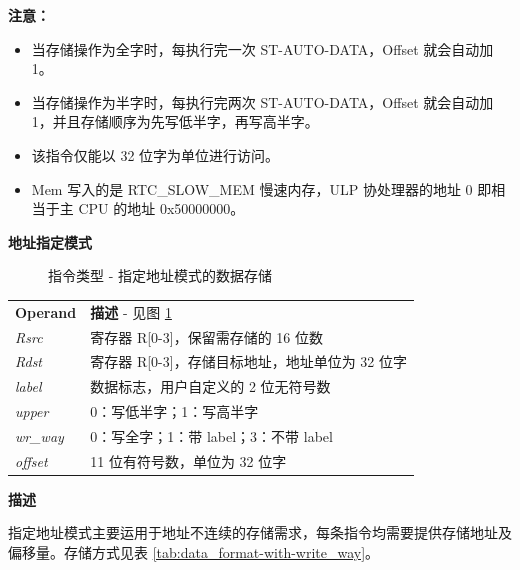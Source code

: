 \documentclass[main\_\_CN.tex]{subfiles}
\begin{document}
\textbf{注意：}
\begin{itemize}
    \item 当存储操作为全字时，每执行完一次 ST-AUTO-DATA，Offset 就会自动加 1。
    \item 当存储操作为半字时，每执行完两次 ST-AUTO-DATA，Offset 就会自动加 1，并且存储顺序为先写低半字，再写高半字。
    \item 该指令仅能以 32 位字为单位进行访问。
    \item Mem 写入的是 RTC\_SLOW\_MEM 慢速内存，ULP 协处理器的地址 0 即相当于主 CPU 的地址 0x{}50000000。
\end{itemize}

\textcolor{istcolor}{\textbf{ 地址指定模式}}

%
%
%
%
%
%
%
%
%
%
\begin{figure}[H]
    \centering
    \caption{指令类型 - 指定地址模式的数据存储}
    \label{fig:STM}
\end{figure}

\begin{tabular}{ l l }
\textbf{Operand} & \textbf{描述} - 见图 \ref{fig:STM} \\
\textit{Rsrc} & 寄存器 R[0-3]，保留需存储的 16 位数 \\
\textit{Rdst} & 寄存器 R[0-3]，存储目标地址，地址单位为 32 位字\\
\textit{label} & 数据标志，用户自定义的 2 位无符号数\\
\textit{upper} & 0：写低半字；1：写高半字 \\
\textit{wr\_way} & 0：写全字；1：带 label；3：不带 label \\
\textit{offset} & 11 位有符号数，单位为 32 位字\\
\end{tabular}

\textbf{描述}

指定地址模式主要运用于地址不连续的存储需求，每条指令均需要提供存储地址及偏移量。存储方式见表 \ref{tab:data_format-with-write_way}。\\
\end{document}

